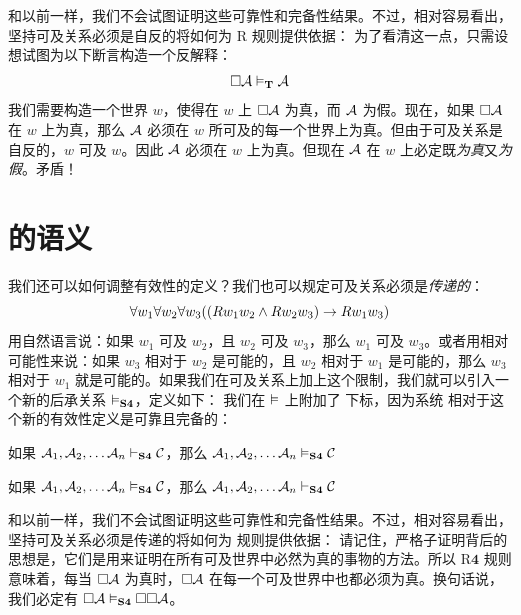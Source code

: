 和以前一样，我们不会试图证明这些可靠性和完备性结果。不过，相对容易看出，坚持可及关系必须是自反的将如何为 R\mlT{} 规则提供依据：
为了看清这一点，只需设想试图为以下断言构造一个反解释：
\[
	\Box \mathcal{A}\vDash_{\mathbf{T}} \mathcal{A}
\]
我们需要构造一个世界 $w$，使得在 $w$ 上 $\Box \mathcal{A}$ 为真，而 $\mathcal{A}$ 为假。现在，如果 $\Box \mathcal{A}$ 在 $w$ 上为真，那么 $\mathcal{A}$ 必须在 $w$ 所可及的每一个世界上为真。但由于可及关系是自反的，$w$ 可及 $w$。因此 $\mathcal{A}$ 必须在 $w$ 上为真。但现在 $\mathcal{A}$ 在 $w$ 上必定既\emph{为真}又\emph{为假}。矛盾！

\section{\mlSfour 的语义}
\label{SemanticsS4}

我们还可以如何调整有效性的定义？我们也可以规定可及关系必须是\emph{传递的}：
\[\forall w_1\forall w_2\forall w_3 ((Rw_1w_2 \wedge Rw_2w_3)\rightarrow Rw_1w_3)\]
用自然语言说：如果 $w_1$ 可及 $w_2$，且 $w_2$ 可及 $w_3$，那么 $w_1$ 可及 $w_3$。或者用相对可能性来说：如果 $w_3$ 相对于 $w_2$ 是可能的，且 $w_2$ 相对于 $w_1$ 是可能的，那么 $w_3$ 相对于 $w_1$ 就是可能的。如果我们在可及关系上加上这个限制，我们就可以引入一个新的后承关系 $\vDash_{\mathbf{S4}}$，定义如下：
我们在 $\vDash$ 上附加了 \mlSfour{} 下标，因为系统 \mlSfour{} 相对于这个新的有效性定义是可靠且完备的：


\begin{compactlist}
	\item 如果 $\mathcal{A}_1,\mathcal{A}_2, \dots \mathcal{A}_n\vdash_{\mathbf{S4}}\mathcal{C}$，那么 $\mathcal{A}_1,\mathcal{A}_2, \dots \mathcal{A}_n\vDash_{\mathbf{S4}}\mathcal{C}$
	\item 如果 $\mathcal{A}_1,\mathcal{A}_2, \dots \mathcal{A}_n\vDash_{\mathbf{S4}}\mathcal{C}$，那么 $\mathcal{A}_1,\mathcal{A}_2, \dots \mathcal{A}_n\vdash_{\mathbf{S4}}\mathcal{C}$
\end{compactlist}


和以前一样，我们不会试图证明这些可靠性和完备性结果。不过，相对容易看出，坚持可及关系必须是传递的将如何为 \mlSfour{} 规则提供依据：
请记住，严格子证明背后的思想是，它们是用来证明在所有可及世界中必然为真的事物的方法。所以 R$\mathbf{4}$ 规则意味着，每当 $\Box \mathcal{A}$ 为真时，$\Box \mathcal{A}$ 在每一个可及世界中也都必须为真。换句话说，我们必定有 $\Box\mathcal{A} \vDash_{\mathbf{S4}} \Box\Box\mathcal{A}$。


